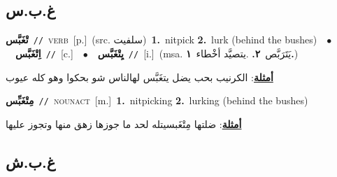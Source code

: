 \documentclass[10pt,a4paper,twoside]{article} %
\begin{document}
\begin{multicols}{2}
\vspace{-3mm}
\subsection*{\color{blue}\foreignlanguage{arabic}{غ.ب.س}\color{blue}{}} 

{\setlength\topsep{0pt}\textbf{\foreignlanguage{arabic}{تْغَبَّس}}\ {\color{gray}\texttt{//}\color{black}}\ \textsc{verb}\ [p.]\ (src. \color{gray}\foreignlanguage{arabic}{سلفيت}\color{black})\ \textbf{1.}~nitpick  \textbf{2.}~lurk (behind the bushes)\ \ $\bullet$\ \ \setlength\topsep{0pt}\textbf{\foreignlanguage{arabic}{اِتْغَبَّس}}\ {\color{gray}\texttt{//}\color{black}}\ [c.]\ \ $\bullet$\ \ \setlength\topsep{0pt}\textbf{\foreignlanguage{arabic}{يِتْغَبَّس}}\ {\color{gray}\texttt{//}\color{black}}\ [i.]\ \color{gray}(msa. \foreignlanguage{arabic}{يَتَرَبَّص}~\foreignlanguage{arabic}{\textbf{٢.}}  .\foreignlanguage{arabic}{يتصيَّد أخْطاء}~\foreignlanguage{arabic}{\textbf{١.}})\color{black}\  \begin{flushright}\color{gray}\foreignlanguage{arabic}{\textbf{\underline{\foreignlanguage{arabic}{أمثلة}}}: الكرنيب بحب يضل يتغَبَّس لهالناس شو بحكوا وهو كله عيوب}\end{flushright}\color{black}} \vspace{2mm}

{\setlength\topsep{0pt}\textbf{\foreignlanguage{arabic}{مِتْغَبِّس}}\ {\color{gray}\texttt{//}\color{black}}\ \textsc{noun\textunderscore act}\ [m.]\ \textbf{1.}~nitpicking  \textbf{2.}~lurking (behind the bushes)\  \begin{flushright}\color{gray}\foreignlanguage{arabic}{\textbf{\underline{\foreignlanguage{arabic}{أمثلة}}}: ضلتها مِتْغَبسيتله لحد ما جوزها زهق منها وتجوز عليها}\end{flushright}\color{black}} \vspace{2mm}

\vspace{-3mm}
\subsection*{\color{blue}\foreignlanguage{arabic}{غ.ب.ش}\color{blue}{}} 


\end{multicols}
\end{document}
